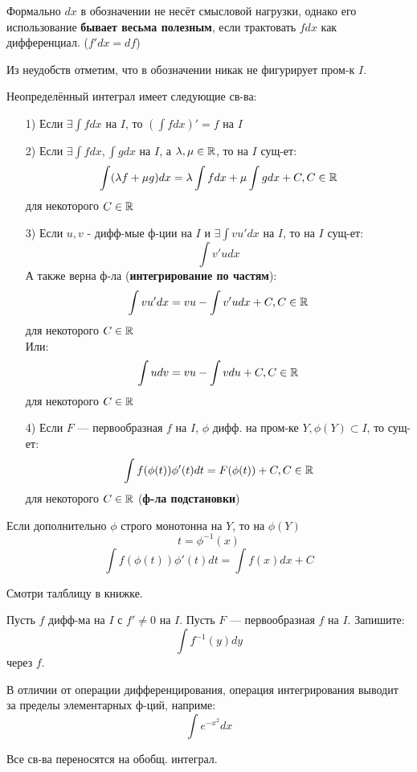 \begin{note}
  Формально $dx$ в обозначении не несёт смысловой нагрузки, однако его использование \textbf{бывает весьма полезным}, если трактовать $f dx$ как дифференциал. ($f' dx = df$)
\end{note} 
\begin{note}
Из неудобств отметим, что в обозначении никак не фигурирует пром-к $I$.
\end{note}
\begin{statement}
Неопределённый интеграл имеет следующие св-ва:
\begin{itemize}
  \item [1) ] Если $\exists \int f dx$ на $I$, то $\left(\int f dx\right)' = f$ на $I$
  \item [2) ] Если $\exists \int f dx, \int g dx$ на $I$, а $\lambda, \mu \in \mathbb{R}$, то на $I$ сущ-ет:
    \[
    \int (\lambda f + \mu g) dx = \lambda \int f dx + \mu \int g dx + C, C \in \mathbb{R}
    \]
    для некоторого $C \in \mathbb{R}$ \\
  \item [3) ] Если $u, v$ - дифф-мые ф-ции на $I$ и $\exists \int vu' dx$ на $I$, то на $I$ сущ-ет:
    \[
      \int v'u dx
    \]
    А также верна ф-ла (\textbf{интегрирование по частям}):
    \[
      \int vu' dx = vu - \int v'u dx + C, C \in \mathbb{R}
    \]
    для некоторого $C \in \mathbb{R}$ \\
    Или:
    \[
    \int u dv = vu - \int v du + C, C \in \mathbb{R}
    \]
    для некоторого $C \in \mathbb{R}$ \\
  \item [4) ] Если $F$ --- первообразная $f$ на $I$, $\phi$ дифф. на пром-ке $Y, \phi(Y) \subset I$, то сущ-ет:
    \[
    \int f(\phi(t)) \phi'(t) dt = F(\phi(t)) + C, C \in \mathbb{R}
    \]
    для некоторого $C \in \mathbb{R}$ (\textbf{ф-ла подстановки}) \\
\end{itemize} 
\end{statement}
\begin{note}
Если дополнительно $\phi$ строго монотонна на $Y$, то на $\phi(Y)$
\[
t = \phi^{-1}(x)
\]
\[
    \int f(\phi(t)) \phi'(t) dt = \int f(x) dx + C 
\]
\end{note}
\begin{theorem}
  \label{th:integral_table}
  Смотри талблицу в книжке.
\end{theorem}
\begin{task}
Пусть $f$ дифф-ма на $I$ с $f' \neq 0$ на $I$. Пусть $F$ --- первообразная $f$ на $I$. Запишите:
\[
\int f^{-1}(y) dy
\]
через $f$.
\end{task}
\begin{note}
 В отличии от операции дифференцирования, операция интегрирования выводит за пределы элементарных ф-ций, наприме:
 \[
  \int e^{-x^{2}} dx
 \]
\end{note}
\begin{note}
Все св-ва переносятся на обобщ. интеграл.
\end{note}
